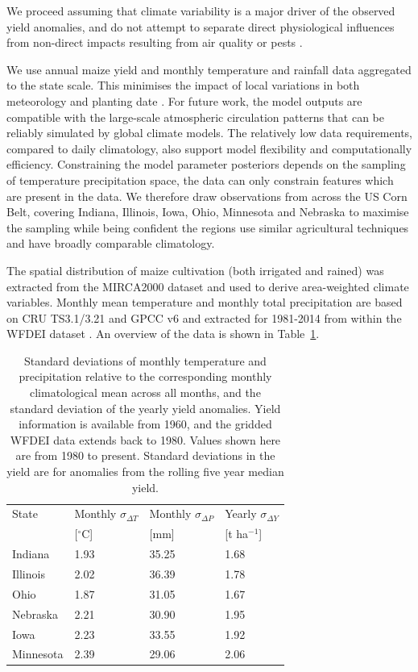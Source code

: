 \documentclass[12pt]{iopart}
\newcommand{\remove}[1]{}
\newcommand{\add}[1]{#1}
\begin{document}
We \add{proceed} assuming that climate variability is \add{a major}\remove{the dominant} driver of the \remove{resulting}\add{observed} yield anomalies, and do not attempt to separate direct physiological influences from non-direct impacts resulting from air quality or pests \citep{Gornall:2010}.

We use annual maize yield and monthly temperature and rainfall data aggregated to the state scale. This minimises the impact of local variations in both meteorology and planting date \citep[e.g.][]{schlenker:2009, lobell:2010}. For future work, the model outputs are compatible with the large-scale atmospheric circulation patterns that can be reliably simulated by global climate models. The relatively low data requirements, compared to daily climatology, also support model flexibility and computationally efficiency. Constraining the model parameter posteriors depends on the sampling of temperature precipitation space, the data can only constrain features which are present in the data. We therefore draw observations from across the US Corn Belt, covering Indiana, Illinois, Iowa, Ohio, Minnesota and Nebraska to maximise the sampling while being confident the regions use similar agricultural techniques and have broadly comparable climatology.

The spatial distribution of maize cultivation (both irrigated and rained) was extracted from the MIRCA2000 dataset \citep{Portmann:2010} and used to derive area-weighted climate variables. Monthly mean temperature and monthly total precipitation are based on CRU TS3.1/3.21 \citep{Harris:2014} and GPCC v6 \citep{Schneider:2014} and extracted for 1981-2014 from within the WFDEI dataset \citep{Weedon:2014}. An overview of the data is shown in Table~\ref{table:data}. 

\begin{table}
\centering
\caption{
Standard deviations of monthly temperature and precipitation relative to the corresponding monthly climatological mean across all months, and the standard deviation of the yearly yield anomalies. Yield information is available from 1960, and the gridded WFDEI data extends back to 1980. Values shown here are from 1980 to present. Standard deviations in the yield are for anomalies from the rolling five year median yield.}


\label{table:data}
\vskip 0.15in
\begin{tabular}{llll}
State  & 
Monthly $\sigma_{\Delta T}$   & 
Monthly $\sigma_{\Delta P}$   & 
Yearly $\sigma_{\Delta Y}$   \\

& [$^\circ$C] & [mm] & [t ha$^{-1}$]\\
\hline
Indiana & 1.93 & 35.25 & 1.68 \\ 
Illinois & 2.02 & 36.39 & 1.78 \\ 
Ohio & 1.87 & 31.05 & 1.67 \\ 
Nebraska & 2.21 & 30.90 & 1.95 \\ 
Iowa & 2.23 & 33.55 & 1.92 \\ 
Minnesota & 2.39 & 29.06 & 2.06 \\ 
\end{tabular}
\end{table}
\end{document}

